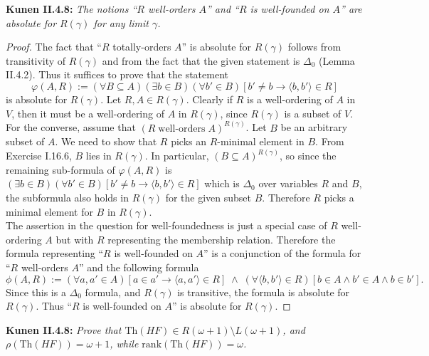\documentclass{article}
\begin{document}
\textbf{Kunen II.4.8:} \it The notions ``$R$ well-orders $A$'' and ``$R$ is
  well-founded on $A$'' are absolute for $R(\gamma)$ for any limit
  $\gamma$.

  \begin{proof}
    The fact that ``$R$ totally-orders $A$'' is absolute for $R(\gamma)$
    follows from transitivity of $R(\gamma)$ and from the fact that the
    given statement is $\Delta_0$ (Lemma II.4.2). Thus it suffices to prove
    that the statement
    \[\varphi(A,R) :=(\forall B\subseteq A)(\exists b\in B)(\forall b'\in
    B) [b'\neq b\rightarrow \langle b,b'\rangle \in R]\]
    is absolute for $R(\gamma)$. Let $R,A\in R(\gamma)$. Clearly if $R$ is
    a well-ordering of $A$ in $V$, then it must be a well-ordering of $A$
    in $R(\gamma)$, since $R(\gamma)$ is a subset of $V$. For the converse,
    assume that $(R\; \text{well-orders}\; A)^{R(\gamma)}$. Let $B$ be an
    arbitrary subset of $A$. We need to show that $R$ picks an $R$-minimal
    element in $B$. From Exercise I.16.6, $B$ lies in $R(\gamma)$. In
    particular, $(B\subseteq A)^{R(\gamma)}$, so since the remaining
    sub-formula of $\varphi(A,R)$ is $(\exists b\in B)(\forall b'\in B)
    [b'\neq b\rightarrow \langle b,b'\rangle \in R]$ which is $\Delta_0$
    over variables $R$ and $B$, the subformula also holds in $R(\gamma)$
    for the given subset $B$. Therefore $R$ picks a minimal element for $B$
    in $R(\gamma)$. \\

    The assertion in the question for well-foundedness is just a special
    case of $R$ well-ordering $A$ but with $R$ representing the membership
    relation. Therefore the formula representing ``$R$ is well-founded on
    $A$'' is a conjunction of the formula for ``$R$ well-orders $A$'' and
    the following formula
    \[\phi(A,R):= (\forall a,a'\in A) [a\in a'\rightarrow \langle
    a,a'\rangle \in R]\; \wedge\; (\forall \langle b,b'\rangle\in R) [b\in
    A \wedge b'\in A \wedge b\in b'].\]
    Since this is a $\Delta_0$ formula, and $R(\gamma)$ is transitive, the
    formula is absolute for $R(\gamma)$. Thus ``$R$ is well-founded on
    $A$'' is absolute for $R(\gamma)$.
  \end{proof}

\textbf{Kunen II.4.8:} \it Prove that $\text{Th}(HF) \in R(\omega+1)
  \setminus L(\omega+1)$, and $\rho(\text{Th}(HF)) =\omega+1$, while
  $\text{rank}(\text{Th}(HF)) =\omega$.
\end{document}
